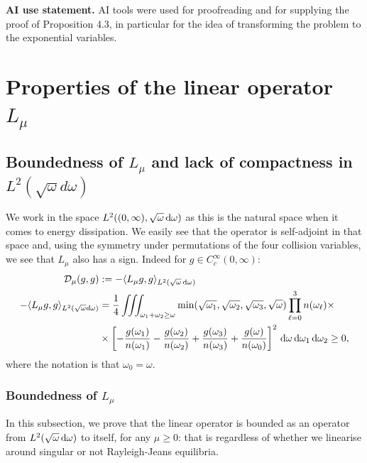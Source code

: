 \documentclass[reqno,11pt,letterpaper]{amsart}
\numberwithin{equation}{section}
\newcommand{\dd}{\, {\rm d}}
\begin{document}
\noindent
\textbf{AI use statement.}
AI tools were used for proofreading and for supplying the proof of Proposition 4.3, in particular for the idea of transforming the problem to the exponential variables.

\section{Properties of the linear operator $L_\mu$} \label{sec:properties of L}

\subsection{Boundedness of $L_\mu$ and lack of compactness in $L^2(\sqrt \omega d\omega )$ } \label{subsec:Boundedness_NoComp_KerL}

We work in the space $L^2((0, \infty), \sqrt{\omega} \dd \omega)$ as this is the natural space when it comes to energy dissipation. We easily see that the operator is self-adjoint in that space and, using the symmetry under permutations of the four collision variables, we see that $L_\mu$ also has a sign. Indeed for $g \in C_c^\infty(0, \infty)$: 
\begin{equation}
\begin{split}
   \mathcal{D}_{\mu}(g,g) &:= - \langle L_\mu g, g \rangle_{L^2(\sqrt{\omega} \dd \omega)} \\
  - \langle L_\mu g, g \rangle_{L^2(\sqrt{\omega} d \omega)} & = \frac{1}{4} \iiint_{\omega_1+\omega_2\geq \omega} \min (\sqrt{\omega_1}, \sqrt{\omega_2}, \sqrt{\omega_3}, \sqrt{\omega}) \prod_{\ell=0}^3 n(\omega_\ell) \times 
    \\
    & \times \left[- \frac{g(\omega_1)}{n (\omega_1)} - \frac{g(\omega_2)}{n(\omega_2)} + \frac{g(\omega_3)}{n (\omega_3)} + \frac{g(\omega)}{n(\omega_0)} \right]^2 \dd \omega \dd \omega_1 \dd \omega_2 \geq 0, 
\end{split}
    \end{equation}
where the notation is that $\omega_0=\omega$. 

\subsubsection{Boundedness of $L_\mu$} \label{subsec:BoundedL_mu}
In this subsection, we prove that the linear operator is bounded as an operator from $L^2(\sqrt{\omega} \dd \omega)$ to itself, for any $\mu\geq 0$: that is regardless of whether we linearise around singular or not Rayleigh-Jeans equilibria.   
\end{document}

